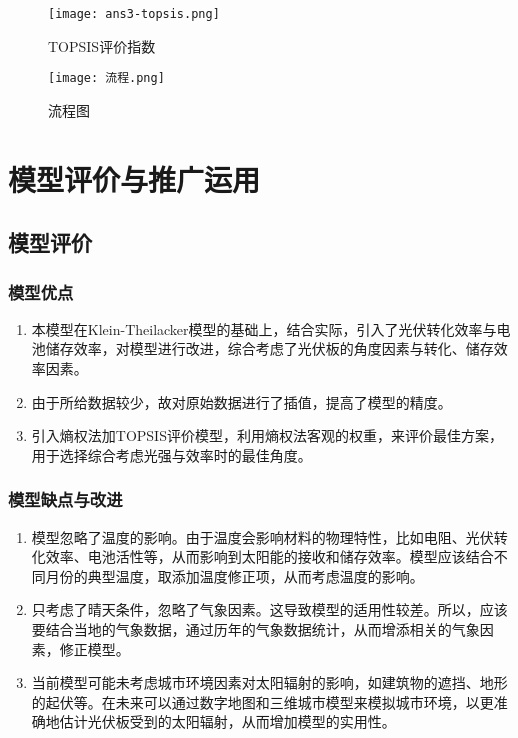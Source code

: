 \documentclass[withoutpreface,bwprint]{cumcmthesis} %
\begin{document}
\begin{figure}[!h]
	\centering
	\texttt{[image: ans3-topsis.png]}
	\caption{TOPSIS评价指数}
	\label{fig:002}
\end{figure}



\begin{figure}[!h]
	\centering
	\texttt{[image: 流程.png]}
	\caption{流程图}
	\label{fig:002}
\end{figure}


\newpage

\section{模型评价与推广运用}

\subsection{模型评价}

\subsubsection{模型优点}
\begin{enumerate}
	\item 本模型在Klein-Theilacker模型的基础上，结合实际，引入了光伏转化效率与电池储存效率，对模型进行改进，综合考虑了光伏板的角度因素与转化、储存效率因素。
	\item 由于所给数据较少，故对原始数据进行了插值，提高了模型的精度。
	\item 引入熵权法加TOPSIS评价模型，利用熵权法客观的权重，来评价最佳方案，用于选择综合考虑光强与效率时的最佳角度。
\end{enumerate}

\subsubsection{模型缺点与改进}
\begin{enumerate}
	\item 模型忽略了温度的影响。由于温度会影响材料的物理特性，比如电阻、光伏转化效率、电池活性等，从而影响到太阳能的接收和储存效率。模型应该结合不同月份的典型温度，取添加温度修正项，从而考虑温度的影响。
	\item 只考虑了晴天条件，忽略了气象因素。这导致模型的适用性较差。所以，应该要结合当地的气象数据，通过历年的气象数据统计，从而增添相关的气象因素，修正模型。
	\item 当前模型可能未考虑城市环境因素对太阳辐射的影响，如建筑物的遮挡、地形的起伏等。在未来可以通过数字地图和三维城市模型来模拟城市环境，以更准确地估计光伏板受到的太阳辐射，从而增加模型的实用性。
\end{enumerate}
\end{document}
